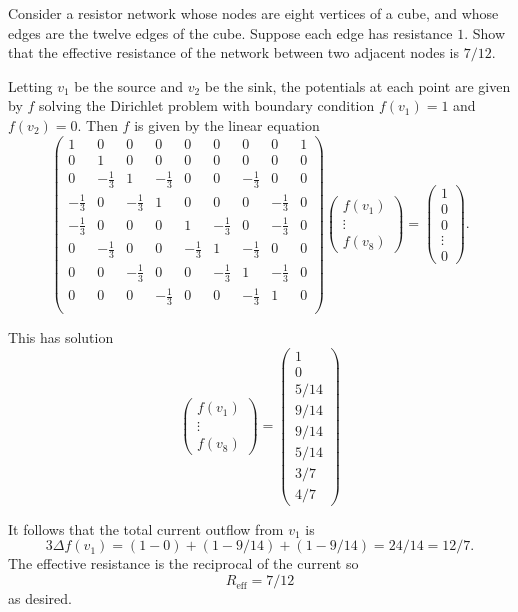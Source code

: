 \documentclass[12 pt, letterpaper]{hmcpset}
\begin{document}
\pagebreak

\begin{problem}[44.]
	Consider a resistor network whose nodes are eight vertices of a cube, and whose edges are the twelve edges of the cube. Suppose each edge has resistance $1$. Show that the effective resistance of the network between two adjacent nodes is $7 / 12$.
\end{problem}

\begin{solution}
	Letting $v_{1}$ be the source and $v_{2}$ be the sink, the potentials at each point are given by $f$ solving the Dirichlet problem with boundary condition $f(v_{1}) = 1$ and $f(v_{2}) = 0$. Then $f$ is given by the linear equation
	\[
		\begin{pmatrix}
   1 &    0 &    0 &    0 &    0 &    0 &    0 &    0 & 1 \\
   0 &    1 &    0 &    0 &    0 &    0 &    0 &    0 & 0 \\
   0 & -\frac{1}{3} &    1 & -\frac{1}{3} &    0 &    0 & -\frac{1}{3} &    0 & 0 \\
-\frac{1}{3} &    0 & -\frac{1}{3} &    1 &    0 &    0 &    0 & -\frac{1}{3} & 0 \\
-\frac{1}{3} &    0 &    0 &    0 &    1 & -\frac{1}{3} &    0 & -\frac{1}{3} & 0 \\
   0 & -\frac{1}{3} &    0 &    0 & -\frac{1}{3} &    1 & -\frac{1}{3} &    0 & 0 \\
   0 &    0 & -\frac{1}{3} &    0 &    0 & -\frac{1}{3} &    1 & -\frac{1}{3} & 0 \\
   0 &    0 &    0 & -\frac{1}{3} &    0 &    0 & -\frac{1}{3} &    1 & 0 \\
 
\end{pmatrix} \begin{pmatrix}
	f(v_{1}) \\
	\vdots \\
	f(v_{8})
\end{pmatrix} = \begin{pmatrix}
	1 \\
	0 \\
	0 \\
	\vdots \\
	0
\end{pmatrix}.
	\]

	This has solution
	\[
		\begin{pmatrix}
	f(v_{1}) \\
	\vdots \\
	f(v_{8})
\end{pmatrix} = \begin{pmatrix}
	1 \\
	0 \\
	5 / 14 \\
	9 / 14 \\
	9 / 14 \\
	5 / 14 \\
	3 / 7 \\
	4 / 7
\end{pmatrix}
	\]

	It follows that the total current outflow from $v_{1}$ is
	\[
		3 \Delta f(v_{1}) = (1 - 0) + (1 - 9 / 14) + (1 - 9 / 14) = 24/14 = 12/7.
	\]
	The effective resistance is the reciprocal of the current so
	\[
		R_{\text{eff}} = 7/12
	\]
	as desired.
\end{solution}
\end{document}
